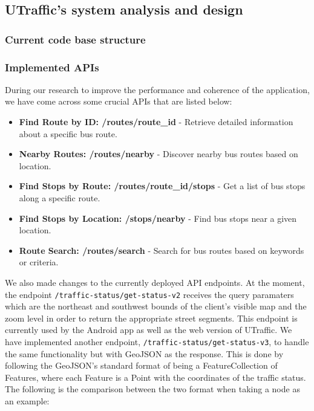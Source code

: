 \subsection{UTraffic's system analysis and design}

\subsubsection{Current code base structure}

\subsubsection{Implemented APIs}

During our research to improve the performance and coherence of the application, we have come across some crucial APIs that are listed below:
\begin{itemize}
    \item \textbf{Find Route by ID: /routes/route\_id} - Retrieve detailed information about a specific bus route.
    \item \textbf{Nearby Routes: /routes/nearby} - Discover nearby bus routes based on location.
    \item \textbf{Find Stops by Route: /routes/route\_id/stops} - Get a list of bus stops along a specific route.
    \item \textbf{Find Stops by Location: /stops/nearby} - Find bus stops near a given location.
    \item \textbf{Route Search: /routes/search} - Search for bus routes based on keywords or criteria.
\end{itemize}

We also made changes to the currently deployed API endpoints. At the moment, the endpoint \lstinline{/traffic-status/get-status-v2} receives the query paramaters which are the northeast and southwest bounds of the client's visible map and the zoom level in order to return the appropriate street segments. This endpoint is currently used by the Android app as well as the web version of UTraffic. We have implemented another endpoint, \lstinline{/traffic-status/get-status-v3}, to handle the same functionality but with GeoJSON as the response. This is done by following the GeoJSON's standard format of being a FeatureCollection of Features, where each Feature is a Point with the coordinates of the traffic status. The following is the comparison between the two format when taking a node as an example:

